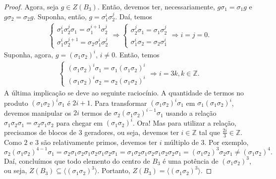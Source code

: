 \begin{proof}
		\par\vspace{0.3cm} Agora, seja $g\in Z(B_3)$. Então, devemos ter, necessariamente, 
		$g\sigma_1 = \sigma_1g$ e $g\sigma_2 = \sigma_2g$. Suponha, então, $g = \sigma_1^i\sigma_2^j$. Daí, temos
		\begin{align*}
    		\begin{cases}
        		\sigma_1^i\sigma_2^j\sigma_1 = \sigma_1^{i+1}\sigma_2^j \\
        		\sigma_1^i\sigma_2^{j+1} = \sigma_2\sigma_1^{i}\sigma_2^j
    		\end{cases} 
    		\Rightarrow 
    		\begin{cases}
        		\sigma_2^j\sigma_1 = \sigma_1\sigma_2^j \\
        		\sigma_1^i\sigma_2 = \sigma_2\sigma_1^i
    		\end{cases} 
    		\Rightarrow i = j = 0.
		\end{align*} 
		Suponha, agora, $g = (\sigma_1\sigma_2)^i$, $i\neq 0$. Então, temos
		\begin{align*}
    		\begin{cases}
        		(\sigma_1\sigma_2)^i\sigma_1 = \sigma_1(\sigma_1\sigma_2)^i \\
        		(\sigma_1\sigma_2)^i\sigma_2 = \sigma_2(\sigma_1\sigma_2)^i
    		\end{cases} 
    		\Rightarrow i = 3k, k\in\mathbb{Z}.
		\end{align*}
		A última implicação se deve ao seguinte raciocínio. 
		A quantidade de termos no produto $(\sigma_1\sigma_2)^i\sigma_1$ é $2i+1$. 
		Para transformar $(\sigma_1\sigma_2)^i\sigma_1$ em $\sigma_1(\sigma_1\sigma_2)^i$, 
		devemos manipular os $2i$ termos de $\sigma_2(\sigma_1\sigma_2)^{i-1}\sigma_1$ 
		usando a relação $\sigma_1\sigma_2\sigma_1 = \sigma_2\sigma_1\sigma_2$ 
		para chegar em $(\sigma_1\sigma_2)^i$. Ora! Mas para utilizar a relação, 
		precisamos de blocos de $3$ geradores, ou seja, devemos ter $i\in\mathbb{Z}$ 
		tal que $\displaystyle{\frac{2i}{3}\in\mathbb{Z}}$. Como $2$ e $3$ são relativamente primos, 
		devemos ter $i$ múltiplo de $3$.
		Por exemplo, 
		\[
		\sigma_2(\sigma_1\sigma_2)^{4-1}\sigma_1 
		= \sigma_2\sigma_1\sigma_2\sigma_1\sigma_2\sigma_1\sigma_2\sigma_1 
		= \sigma_1\sigma_2\sigma_1\sigma_2\sigma_1\sigma_2\sigma_2\sigma_1 
		= (\sigma_1\sigma_2)^3\sigma_2\sigma_1\neq(\sigma_1\sigma_2)^4.
		\]
		Daí, concluímos que todo elemento do centro de $B_3$ é uma potência de $(\sigma_1\sigma_2)^3$, 
		ou seja, $Z(B_3)\subseteq\langle (\sigma_1\sigma_2)^3 \rangle$. Portanto, 
		$Z(B_3) = \langle (\sigma_1\sigma_2)^3 \rangle$.
	\end{proof}
